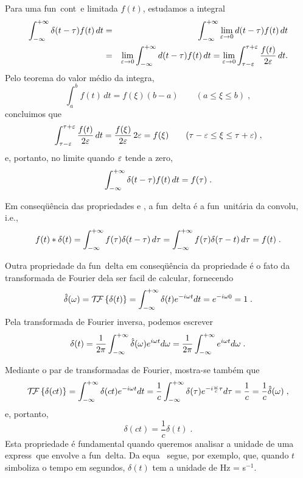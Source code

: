 Para uma fun\cao\ cont\inua\ e limitada $f(t)$, estudamos a integral
\begin{eqnarray}
\int_{-\infty}^{+\infty} \delta(t-\tau)f(t) \, dt
& = & \int_{-\infty}^{+\infty} \lim_{\varepsilon\to0} d(t-\tau) f(t) \, dt
\nonumber \\ & = &
\lim_{\varepsilon\to0} \int_{-\infty}^{+\infty} d(t-\tau) f(t) \, dt
=
\lim_{\varepsilon\to0} \int_{\tau-\varepsilon}^{\tau+\varepsilon}
\frac{f(t)}{2\varepsilon} \, dt.
\end{eqnarray}
Pelo teorema do valor m\'edio da integra\cao,
\begin{equation}
\int_a^b f(t) \, dt = f(\xi) (b-a) \qquad (a\leq\xi\leq b) \; ,
\label{eq:tvm}
\end{equation}
concluimos que
\begin{equation}
\int_{\tau-\varepsilon}^{\tau+\varepsilon} \frac{f(t)}{2\varepsilon} \, dt
= \frac{f(\xi)}{2\varepsilon} \, 2\varepsilon = f(\xi) 
\qquad (\tau-\varepsilon \leq \xi \leq \tau+\varepsilon) \; ,
\label{eq:res}
\end{equation}
e, portanto, no limite quando $\varepsilon$ tende a zero,
\begin{equation}
\int_{-\infty}^{+\infty} \delta(t-\tau)f(t) \, dt = f(\tau) \; .
\label{eq:samp}
\end{equation}

Em conseq\"u\^encia das propriedades  e ,
a fun\cao\ delta \'e a fun\cao\ unit\'aria da convolu\cao,
i.e.,
\begin{equation}
f(t) * \delta(t) = \int_{-\infty}^{+\infty} f(\tau) \delta(t-\tau) \, d\tau = 
\int_{-\infty}^{+\infty} f(\tau) \delta(\tau-t) \, d\tau = f(t) \; .
\label{eq:unconv}
\end{equation}

Outra propriedade da fun\cao\ delta em conseq\"u\^encia da propriedade
 \'e o fato da transformada de Fourier dela ser facil de
calcular, fornecendo
\begin{equation}
\hat{\delta}(\omega) = {\cal T \kern-2pt F} \left\{ \delta(t) \right\}
= \int_{-\infty}^{+\infty} \delta(t) e^{-i\omega t} dt
= e^{-i\omega 0} = 1 \; .
\label{eq:ftdel}
\end{equation}
Pela transformada de Fourier inversa, podemos escrever
\begin{equation}
\delta(t) = \frac{1}{2\pi} \int_{-\infty}^{+\infty} \hat{\delta}(\omega) e^{i\omega t} d\omega 
= \frac{1}{2\pi} \int_{-\infty}^{+\infty} e^{i\omega t} d\omega \; .
\label{eq:ftidel}
\end{equation}

Mediante o par de transformadas de Fourier, mostra-se tamb\'em que
\begin{equation}
{\cal T \kern-2pt F} \left\{ \delta(ct) \right\} = \int_{-\infty}^{+\infty} \delta(ct) e^{-i\omega t} dt
= \frac{1}{c} \int_{-\infty}^{+\infty} \delta(\tau) e^{-i\frac{\omega}{c}\tau} d\tau =
\frac{1}{c} = \frac{1}{c} \hat{\delta}(\omega) \; ,
\label{eq:scadelf}
\end{equation}
e, portanto, 
\begin{equation}
\delta(ct) = \frac{1}{c} \delta(t) \; .
\label{eq:scadel}
\end{equation}
Esta propriedade \'e fundamental quando queremos analisar a unidade de
uma express\ao\ que envolve a fun\cao\ delta. Da equa\cao\
 segue, por exemplo, que, quando $t$ simboliza o tempo em
segundos, $\delta(t)$ tem a unidade de Hz = s$^{-1}$.

